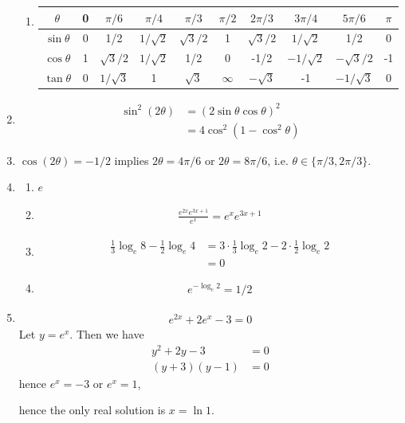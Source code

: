 \begin{enumerate}
\begin{enumerate}
\item
  \begin{table}[h!]
    \centering
    \begin{tabular}{c|ccccccccc}
      $\theta$      & 0 & $\pi/6$      & $\pi/4$      & $\pi/3$     & $\pi/2$  & $2\pi/3$      & $3\pi/4$        & $5\pi/6$      & $\pi$ \\
      \hline
      $\sin \theta$ & 0 & 1/2          & $1/\sqrt{2}$ & $\sqrt{3}/2$ & 1        & $\sqrt{3}/2$ & $1/\sqrt{2}$    & 1/2           & 0\\
      $\cos \theta$ & 1 & $\sqrt{3}/2$ & $1/\sqrt{2}$ & 1/2          & 0        & -1/2         & $-1/\sqrt{2}$   & $-\sqrt{3}/2$ & -1\\
      $\tan \theta$ & 0 & $1/\sqrt{3}$ & 1            & $\sqrt{3}$   & $\infty$ & $-\sqrt{3}$  & -1              & $-1/\sqrt{3}$ & 0
    \end{tabular}
  \end{table}
\end{enumerate}
\item \begin{align*}
    \sin^2(2\theta)
    &= (2\sin\theta\cos\theta)^2 \\
    &= 4\cos^2(1-\cos^2\theta)
  \end{align*}
\item $\cos(2\theta) = -1/2$ implies $2\theta = 4\pi/6$ or $2\theta = 8\pi/6$, i.e. $\theta \in \{\pi/3, 2\pi/3 \}$.
\item
  \begin{enumerate}[label=(\alph*)]
  \item $e$
  \item \begin{align*}
          \frac{e^{2x}e^{3x+1}}{e^x} = e^xe^{3x+1}
        \end{align*}
  \item \begin{align*}
      \frac{1}{3} \log_e 8 - \frac{1}{2} \log_e 4
      &= 3 \cdot \frac{1}{3} \log_e 2 - 2 \cdot \frac{1}{2} \log_e 2 \\
      &= 0
    \end{align*}
  \item \begin{align*}
      e^{-\log_e 2} = 1/2
    \end{align*}
  \end{enumerate}
\item \begin{align*}
    e^{2x} + 2e^x - 3 = 0
  \end{align*}
  Let $y = e^x$. Then we have
  \begin{align*}
    y^2 + 2y - 3   &= 0 \\
    (y + 3)(y - 1) &= 0
  \end{align*}
  hence $e^x = -3$ or $e^x = 1$,

  hence the only real solution is $x = \ln 1$.
\end{enumerate}


